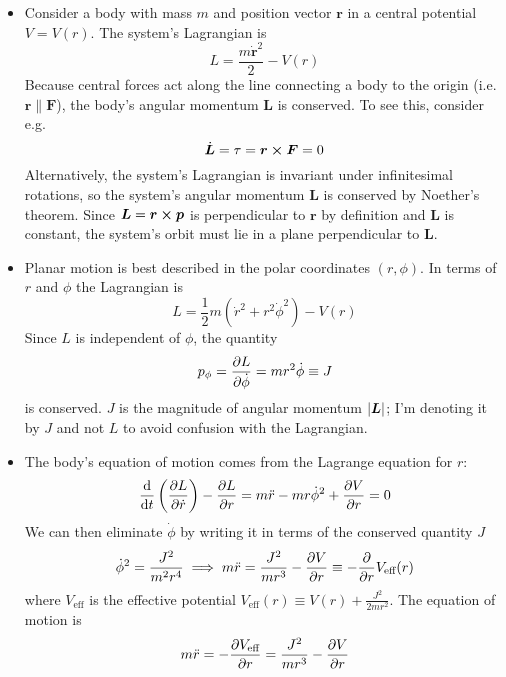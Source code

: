\documentclass[11pt, a4paper]{article}
\newcommand{\bdot}[1]{\dot{\bm{#1}}}
\newcommand{\veff}{V_{\text{eff}}}
\begin{document}
\begin{itemize}
	\item Consider a body with mass $ m $ and position vector $ \bm{r} $ in a central potential $ V = V(r) $. The system's Lagrangian is
	\begin{equation*}
		L = \frac{m\bdot{r}^{2}}{2} - V(r)
	\end{equation*}
	Because central forces act along the line connecting a body to the origin (i.e. $ \bm{r} \parallel \bm{F} $), the body's angular momentum $ \bm{L} $ is conserved. To see this, consider e.g.
	\begin{equation*}
		\bdot{L} = \tau = \bm{r} \cross \bm{F} = 0
	\end{equation*}
	Alternatively, the system's Lagrangian is invariant under infinitesimal rotations, so the system's angular momentum $ \bm{L} $ is conserved by Noether's theorem. Since $ \bm{L} = \bm{r} \cross \bm{p}  $ is perpendicular to $ \bm{r} $ by definition and $ \bm{L} $ is constant, the system's orbit must lie in a plane perpendicular to $ \bm{L} $. 
	
	\item Planar motion is best described in the polar coordinates $ (r, \phi) $. In terms of $ r $ and $ \phi $ the Lagrangian is
	\begin{equation*}
		L = \frac{1}{2} m \left(\dot{r}^{2} + r^{2} \dot{\phi}^{2}\right) - V(r)
	\end{equation*}
	Since $ L $ is independent of $ \phi $, the quantity 
	\begin{equation*}
		p_{\phi} = \pdv{L}{\dot{\phi}} = m r^{2} \dot{\phi} \equiv J
	\end{equation*}
	is conserved. $ J $ is the magnitude of angular momentum $ \abs{\bm{L}} $; I'm denoting it by $ J $ and not $ L $ to avoid confusion with the Lagrangian.
	
	\item The body's equation of motion comes from the Lagrange equation for $ r $:
	\begin{equation*}
		\dv{}{t}\left(\pdv{L}{\dot{r}}\right) - \pdv{L}{r} = m \ddot{r} - m r \dot{\phi}^{2} + \pdv{V}{r} = 0
	\end{equation*}
	We can then eliminate $ \dot{\phi} $ by writing it in terms of the conserved quantity $ J $
	\begin{equation*}
		\dot{\phi}^{2} = \frac{J^{2}}{m^{2} r^{4}} \implies m \ddot{r} = \frac{J^{2}}{m r^{3}} -\pdv{V}{r} \equiv - \pdv{}{r} \veff(r)
	\end{equation*}
	where $ \veff $ is the effective potential $ \veff(r) \equiv V(r) + \frac{J^{2}}{2m r^{2}} $. The equation of motion is
	\begin{equation*}
		m \ddot{r} = -\pdv{\veff}{r} = \frac{J^{2}}{m r^{3}} - \pdv{V}{r}
	\end{equation*}
	

\end{itemize}
\end{document}
